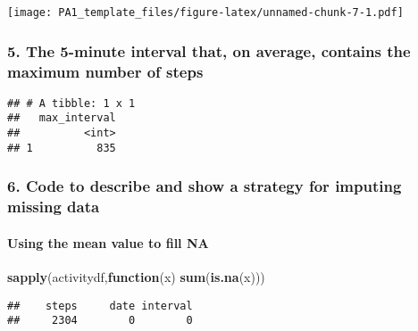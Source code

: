 \documentclass[]{article}
\newenvironment{Shaded}{\begin{snugshade}}{\end{snugshade}}
\newcommand{\KeywordTok}[1]{\textcolor[rgb]{0.13,0.29,0.53}{\textbf{#1}}}
\newcommand{\DataTypeTok}[1]{\textcolor[rgb]{0.13,0.29,0.53}{#1}}
\newcommand{\StringTok}[1]{\textcolor[rgb]{0.31,0.60,0.02}{#1}}
\newcommand{\ControlFlowTok}[1]{\textcolor[rgb]{0.13,0.29,0.53}{\textbf{#1}}}
\newcommand{\OperatorTok}[1]{\textcolor[rgb]{0.81,0.36,0.00}{\textbf{#1}}}
\newcommand{\NormalTok}[1]{#1}
\let\oldparagraph\paragraph
\renewcommand{\paragraph}[1]{\oldparagraph{#1}\mbox{}}
\begin{document}
\texttt{[image: PA1\_template\_files/figure-latex/unnamed-chunk-7-1.pdf]}

\subsubsection{5. The 5-minute interval that, on average, contains the
maximum number of
steps}\label{the-5-minute-interval-that-on-average-contains-the-maximum-number-of-steps}

\begin{Shaded}
\end{Shaded}

\begin{verbatim}
## # A tibble: 1 x 1
##   max_interval
##          <int>
## 1          835
\end{verbatim}

\subsubsection{6. Code to describe and show a strategy for imputing
missing
data}\label{code-to-describe-and-show-a-strategy-for-imputing-missing-data}

\paragraph{Using the mean value to fill
NA}\label{using-the-mean-value-to-fill-na}

\begin{Shaded}
\begin{Highlighting}[]
\KeywordTok{sapply}\NormalTok{(activitydf,}\ControlFlowTok{function}\NormalTok{(x) }\KeywordTok{sum}\NormalTok{(}\KeywordTok{is.na}\NormalTok{(x)))}
\end{Highlighting}
\end{Shaded}

\begin{verbatim}
##    steps     date interval 
##     2304        0        0
\end{verbatim}
\end{document}
